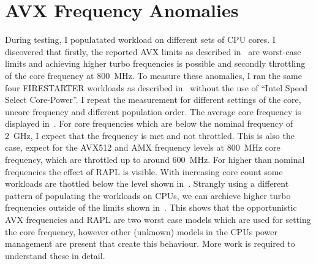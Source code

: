 
\section{AVX Frequency Anomalies}
During testing, I populatated workload on different sets of CPU cores.
I discovered that firstly, the reported AVX limits as described in~ are worst-case limits and achieving higher turbo frequencies is possible and secondly throttling of the core frequency at \SI{800}{\MHz}.
To measure these anomalies, I ran the same four FIRESTARTER workloads as described in~ without the use of ``Intel Speed Select Core-Power''.
I repeat the measurement for different settings of the core, uncore frequency and different population order.
The average core frequency is displayed in~.
For core frequencies which are below the nominal frequency of \SI{2}{\GHz}, I expect that the frequency is met and not throttled.
This is also the case, expect for the AVX512 and AMX frequency levels at \SI{800}{\MHz} core frequency, which are throttled up to around \SI{600}{\MHz}.
For higher than nominal frequencies the effect of RAPL is visible.
With increasing core count some workloads are thottled below the level shown in~.
Strangly using a different pattern of populating the workloads on CPUs, we can archieve higher turbo frequencies outside of the limits shown in~.
This shows that the opportunistic AVX frequencies and RAPL are two worst case models which are used for setting the core frequency, however other (unknown) models in the CPUs power management are present that create this behaviour.
More work is required to understand these in detail.



